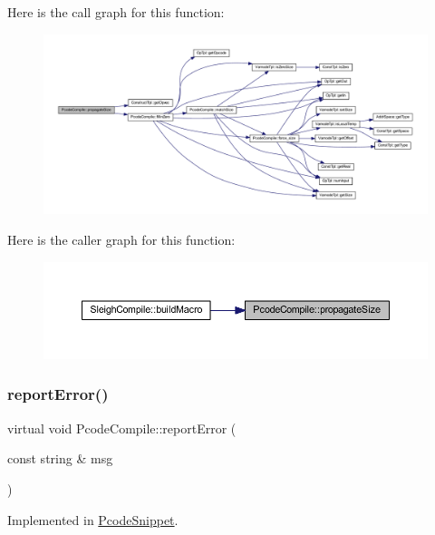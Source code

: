Here is the call graph for this function\+:
\nopagebreak
\begin{figure}[H]
\begin{center}
\leavevmode
\includegraphics[width=350pt]{class_pcode_compile_a107dd115ba53b9158a0c76b6a2368c52_cgraph}
\end{center}
\end{figure}
Here is the caller graph for this function\+:
\nopagebreak
\begin{figure}[H]
\begin{center}
\leavevmode
\includegraphics[width=350pt]{class_pcode_compile_a107dd115ba53b9158a0c76b6a2368c52_icgraph}
\end{center}
\end{figure}
\mbox{\label{class_pcode_compile_af18d2709e08b84b7cb21fbf1411a9f82}} 
\subsubsection{\texorpdfstring{reportError()}{reportError()}}
{\footnotesize\ttfamily virtual void Pcode\+Compile\+::report\+Error (\begin{DoxyParamCaption}\item[{const string \&}]{msg }\end{DoxyParamCaption})\hspace{0.3cm}{\ttfamily [pure virtual]}}



Implemented in \mbox{\hyperlink{class_pcode_snippet_ad9512a3125317bde59fc0de0b6f7d7ad}{Pcode\+Snippet}}.

